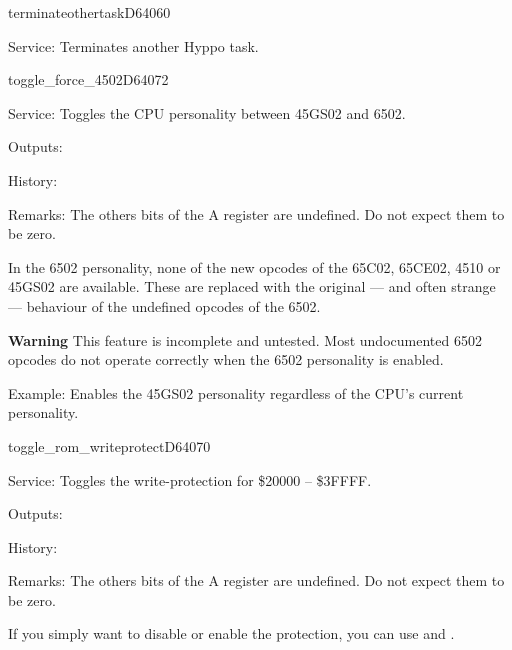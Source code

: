\begin{hyppotrap}{terminateothertask}{D640}{60}
\item [Service:]
  Terminates another Hyppo task.
\notimplemented
\end{hyppotrap}


\newpage
\begin{hyppotrap}{toggle\_force\_4502}{D640}{72}
\item [Service:]
  Toggles the CPU personality between 45GS02 and 6502.
\item [Outputs:]
\item [History:]
\item [Remarks:]
  The others bits of the A register are undefined. Do not expect them to be
  zero.

  In the 6502 personality, none of the new opcodes of the 65C02, 65CE02, 4510
  or 45GS02 are available. These are replaced with the original --- and often
  strange --- behaviour of the undefined opcodes of the 6502.

  \textbf{Warning} This feature is incomplete and untested. Most undocumented
  6502 opcodes do not operate correctly when the 6502 personality is enabled.
\item [Example:] Enables the 45GS02 personality regardless of the CPU's current
  personality.
\end{hyppotrap}


\newpage
\begin{hyppotrap}{toggle\_rom\_writeprotect}{D640}{70}
\item [Service:]
  Toggles the write-protection for \$20000 -- \$3FFFF.
\item [Outputs:]
\item [History:]
\item [Remarks:]
  The others bits of the A register are undefined. Do not expect them to be
  zero.

  If you simply want to disable or enable the protection, you can use
   and .
\end{hyppotrap}


